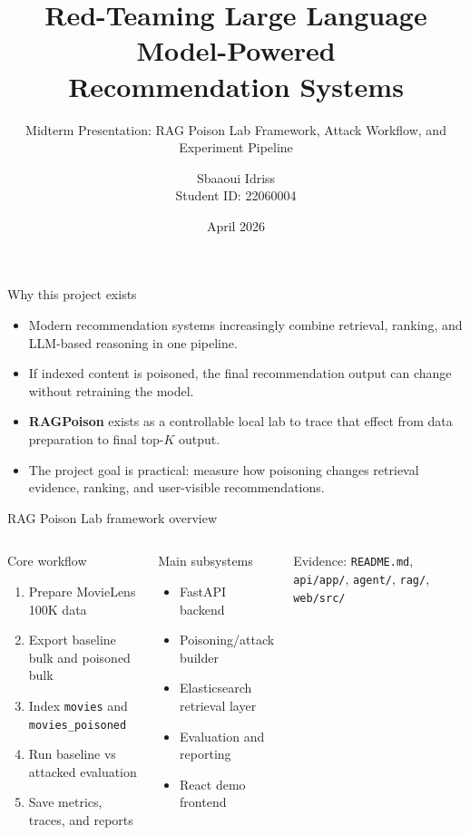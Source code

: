 \documentclass[aspectratio=169,11pt]{beamer}
\title[Midterm]{Red-Teaming Large Language Model-Powered\\Recommendation Systems}
\subtitle{Midterm Presentation: RAG Poison Lab Framework, Attack Workflow, and Experiment Pipeline}
\author[Sbaaoui Idriss]{Sbaaoui Idriss\\Student ID: 22060004}
\institute[ECUST]{Computer Science, 华东理工大学\\Supervisor: 张恒润}
\date{April 2026}
\begin{document}
\begin{frame}[plain]
  \titlepage
\end{frame}

\begin{frame}{Why this project exists}
\begin{itemize}
  \item Modern recommendation systems increasingly combine retrieval, ranking, and LLM-based reasoning in one pipeline.
  \item If indexed content is poisoned, the final recommendation output can change without retraining the model.
  \item \textbf{RAGPoison} exists as a controllable local lab to trace that effect from data preparation to final top-$K$ output.
  \item The project goal is practical: measure how poisoning changes retrieval evidence, ranking, and user-visible recommendations.
\end{itemize}
\end{frame}

\begin{frame}{RAG Poison Lab framework overview}
\begin{columns}[T,totalwidth=\textwidth]
\begin{block}{Core workflow}
\begin{enumerate}
  \item Prepare MovieLens 100K data
  \item Export baseline bulk and poisoned bulk
  \item Index \texttt{movies} and \texttt{movies\_poisoned}
  \item Run baseline vs attacked evaluation
  \item Save metrics, traces, and reports
\end{enumerate}
\end{block}

\begin{block}{Main subsystems}
\begin{itemize}
  \item FastAPI backend
  \item Poisoning/attack builder
  \item Elasticsearch retrieval layer
  \item Evaluation and reporting
  \item React demo frontend
\end{itemize}
\end{block}
\vspace{0.4em}
{\footnotesize Evidence: \texttt{README.md}, \texttt{api/app/}, \texttt{agent/}, \texttt{rag/}, \texttt{web/src/}}
\end{columns}
\end{frame}
\end{document}
